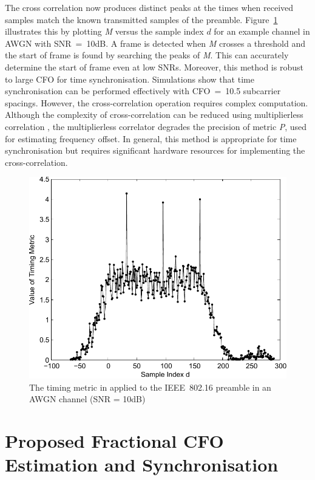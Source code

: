 The cross correlation now produces distinct peaks at the times when received samples match the known transmitted samples of the preamble. Figure~\ref{fig:M2-10dB} illustrates this by plotting \emph{M} versus the sample index $d$ for an example channel in AWGN with SNR~=~10{\thinspace}dB.
A frame is detected when \emph{M} crosses a threshold and the start of frame is found by searching the peaks of \emph{M}.
This can accurately determine the start of frame even at low SNRs.
Moreover, this method is robust to large CFO for time synchronisation.
Simulations \cite{Kishore2006} show that time synchronisation can be performed effectively with CFO~=~10.5 subcarrier spacings.
However, the cross-correlation operation requires complex computation.
Although the complexity of cross-correlation can be reduced using multiplierless correlation \cite{Yip2003}, the multiplierless correlator degrades the precision of metric \emph{P}, used for estimating frequency offset.
In general, this method is appropriate for time synchronisation but requires significant hardware resources for implementing the cross-correlation.

\begin{figure}
	\centerline{\includegraphics [width=0.8\columnwidth] {figures/M2_10dB.pdf} }
	\caption{The timing metric in \cite{Kishore2006} applied to the IEEE~802.16 preamble in an AWGN channel (SNR = 10dB)}
	\label{fig:M2-10dB}
\end{figure}

\section{Proposed Fractional CFO Estimation and Synchronisation}

